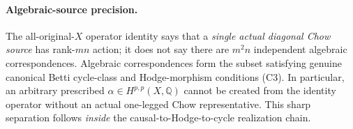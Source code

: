\documentclass[11pt]{article}
\begin{document}
\paragraph{Algebraic-source precision.}
The all-original-$X$ operator identity says
that a \emph{single actual diagonal Chow source}
has rank-$mn$ action; it does not say
there are $m^2n$ independent algebraic
correspondences. Algebraic correspondences form
the subset satisfying genuine canonical Betti
cycle-class and Hodge-morphism conditions
(C3). In particular, an arbitrary prescribed
$\alpha\in H^{p,p}(X,\mathbb Q)$ cannot be
created from the identity operator without
an actual one-legged Chow representative.
This sharp separation follows \emph{inside}
the causal-to-Hodge-to-cycle realization chain.
\end{document}

